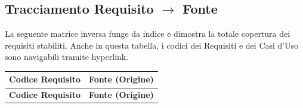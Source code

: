 \newpage
\subsection{Tracciamento Requisito $\rightarrow$ Fonte}
La seguente matrice inversa funge da indice e dimostra la totale copertura dei requisiti stabiliti. Anche in questa tabella, i codici dei Requisiti e dei Casi d'Uso sono navigabili tramite hyperlink.

\renewcommand{\arraystretch}{1.15}
\begin{longtable}{|>{\raggedright}p{}|>{\raggedright\arraybackslash}p{}|}
    \hline
    \rowcolor[gray]{0.9}
    \textbf{Codice Requisito} & \textbf{Fonte (Origine)} \\
    \hline
    \endfirsthead
    
    \hline
    \rowcolor[gray]{0.9}
    \textbf{Codice Requisito} & \textbf{Fonte (Origine)} \\
    \hline
    \endhead


\end{longtable}
